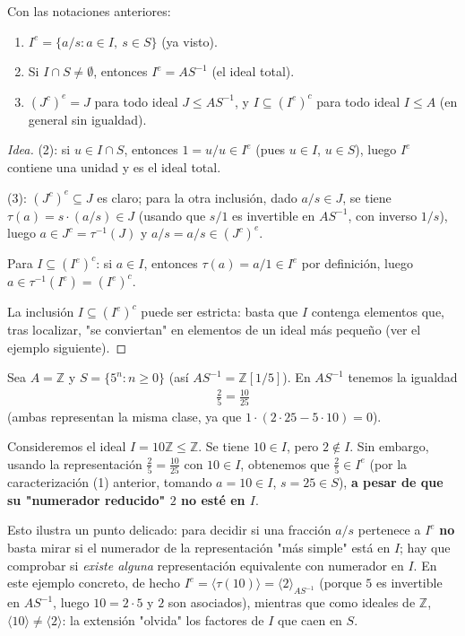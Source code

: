 \begin{prop}
Con las notaciones anteriores:
\begin{enumerate}
    \item $I^e = \{a/s : a\in I,\ s\in S\}$ (ya visto).
    \item Si $I\cap S\neq \emptyset$, entonces $I^e = AS^{-1}$ (el ideal total).
    \item $(J^c)^e = J$ para todo ideal $J\leq AS^{-1}$, y $I \subseteq (I^e)^c$ para todo ideal $I\leq A$ (en general sin igualdad).
\end{enumerate}
\end{prop}
\begin{proof}[Idea]
(2): si $u\in I\cap S$, entonces $1=u/u \in I^e$ (pues $u\in I$, $u\in S$), luego $I^e$ contiene una unidad y es el ideal total.

(3): $(J^c)^e\subseteq J$ es claro; para la otra inclusión, dado $a/s\in J$, se tiene $\tau(a)=s\cdot(a/s)\in J$ (usando que $s/1$ es invertible en $AS^{-1}$, con inverso $1/s$), luego $a\in J^c=\tau^{-1}(J)$ y $a/s = a/s \in (J^c)^e$.

Para $I\subseteq (I^e)^c$: si $a\in I$, entonces $\tau(a)=a/1 \in I^e$ por definición, luego $a\in \tau^{-1}(I^e) = (I^e)^c$.

La inclusión $I\subseteq (I^e)^c$ puede ser estricta: basta que $I$ contenga elementos que, tras localizar, "se conviertan" en elementos de un ideal más pequeño (ver el ejemplo siguiente).
\end{proof}

\begin{ejemplo}
Sea $A=\mathbb{Z}$ y $S=\{5^n : n\geq 0\}$ (así $AS^{-1}=\mathbb{Z}[1/5]$). En $AS^{-1}$ tenemos la igualdad
\begin{gather*}
    \frac{2}{5} = \frac{10}{25}
\end{gather*}
(ambas representan la misma clase, ya que $1\cdot(2\cdot 25 - 5\cdot 10)=0$).

Consideremos el ideal $I = 10\mathbb{Z} \leq \mathbb{Z}$. Se tiene $10\in I$, pero $2\notin I$. Sin embargo, usando la representación $\frac{2}{5}=\frac{10}{25}$ con $10\in I$, obtenemos que $\frac{2}{5}\in I^e$ (por la caracterización (1) anterior, tomando $a=10\in I$, $s=25\in S$), \textbf{a pesar de que su "numerador reducido" $2$ no esté en $I$}.

Esto ilustra un punto delicado: para decidir si una fracción $a/s$ pertenece a $I^e$ \textbf{no} basta mirar si el numerador de la representación "más simple" está en $I$; hay que comprobar si \emph{existe alguna} representación equivalente con numerador en $I$. En este ejemplo concreto, de hecho $I^e = \langle \tau(10)\rangle = \langle 2\rangle_{AS^{-1}}$ (porque $5$ es invertible en $AS^{-1}$, luego $10=2\cdot 5$ y $2$ son asociados), mientras que como ideales de $\mathbb{Z}$, $\langle 10\rangle \neq \langle 2\rangle$: la extensión "olvida" los factores de $I$ que caen en $S$.
\end{ejemplo}

